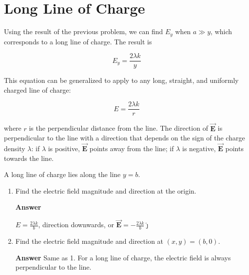 \documentclass{article}
\newcommand{\ds}[0]{\displaystyle}
\newcommand{\jhat}[0]{\hat{\boldsymbol{\jmath}}}
\newcommand{\bfvec}[1]{\vec{\mathbf{#1}}}
\begin{document}
\section{Long Line of Charge}

Using the result of the previous problem, we can find $E_y$ when $a \gg y$, which corresponds to a long line of charge. The result is

\begin{equation}
E_y=\frac{2\lambda k}{y}
\end{equation}

This equation can be generalized to apply to any long, straight, and uniformly charged line of charge:

\begin{equation}
E=\frac{2\lambda k}{r}
\end{equation}

where $r$ is the perpendicular distance from the line. The direction of $\bfvec{E}$ is perpendicular to the line with a direction that depends on the sign of the charge density $\lambda$: if $\lambda$ is positive, $\bfvec{E}$ points away from the line; if $\lambda$ is negative, $\bfvec{E}$ points towards the line.

A long line of charge lies along the line $y=b$.

\begin{enumerate}

  \item Find the electric field magnitude and direction at the origin.

        \ifsolutions
        \textbf{Answer}

        $\ds E=\frac{2\lambda k}{b}$, direction downwards, or $\ds \bfvec{E}=-\frac{2\lambda k}{b}\jhat$
        \else

        \vskip 72pt
        \fi
        \ifsolutions\else
        \vskip 72pt
        \fi

  \item Find the electric field magnitude and direction at $(x,y)=(b,0)$.

        \ifsolutions
        \textbf{Answer} Same as 1. For a long line of charge, the electric field is always perpendicular to the line.
        \fi

\end{enumerate}
\end{document}
